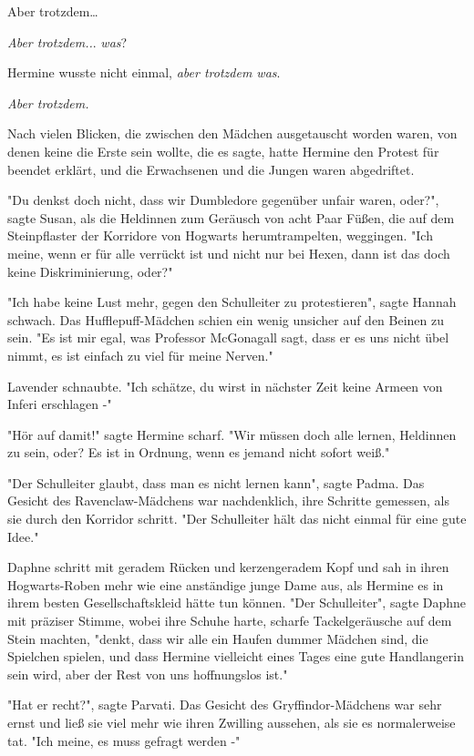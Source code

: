 {Aber trotzdem…

\emph{Aber trotzdem..}. \emph{was}?

Hermine wusste nicht einmal, \emph{aber trotzdem was}.

\emph{Aber trotzdem.}

Nach vielen Blicken, die zwischen den Mädchen ausgetauscht worden waren, von denen keine die Erste sein wollte, die es sagte, hatte Hermine den Protest für beendet erklärt, und die Erwachsenen und die Jungen waren abgedriftet.

"Du denkst doch nicht, dass wir Dumbledore gegenüber unfair waren, oder?", sagte Susan, als die Heldinnen zum Geräusch von acht Paar Füßen, die auf dem Steinpflaster der Korridore von Hogwarts herumtrampelten, weggingen. "Ich meine, wenn er für alle verrückt ist und nicht nur bei Hexen, dann ist das doch keine Diskriminierung, oder?"

"Ich habe keine Lust mehr, gegen den Schulleiter zu protestieren", sagte Hannah schwach. Das Hufflepuff-Mädchen schien ein wenig unsicher auf den Beinen zu sein. "Es ist mir egal, was Professor McGonagall sagt, dass er es uns nicht übel nimmt, es ist einfach zu viel für meine Nerven."

Lavender schnaubte. "Ich schätze, du wirst in nächster Zeit keine Armeen von Inferi erschlagen -"

"Hör auf damit!" sagte Hermine scharf. "Wir müssen doch alle lernen, Heldinnen zu sein, oder? Es ist in Ordnung, wenn es jemand nicht sofort weiß."

"Der Schulleiter glaubt, dass man es nicht lernen kann", sagte Padma. Das Gesicht des Ravenclaw-Mädchens war nachdenklich, ihre Schritte gemessen, als sie durch den Korridor schritt. "Der Schulleiter hält das nicht einmal für eine gute Idee."

Daphne schritt mit geradem Rücken und kerzengeradem Kopf und sah in ihren Hogwarts-Roben mehr wie eine anständige junge Dame aus, als Hermine es in ihrem besten Gesellschaftskleid hätte tun können. "Der Schulleiter", sagte Daphne mit präziser Stimme, wobei ihre Schuhe harte, scharfe Tackelgeräusche auf dem Stein machten, "denkt, dass wir alle ein Haufen dummer Mädchen sind, die Spielchen spielen, und dass Hermine vielleicht eines Tages eine gute Handlangerin sein wird, aber der Rest von uns hoffnungslos ist."

"Hat er recht?", sagte Parvati. Das Gesicht des Gryffindor-Mädchens war sehr ernst und ließ sie viel mehr wie ihren Zwilling aussehen, als sie es normalerweise tat. "Ich meine, es muss gefragt werden -"

}
